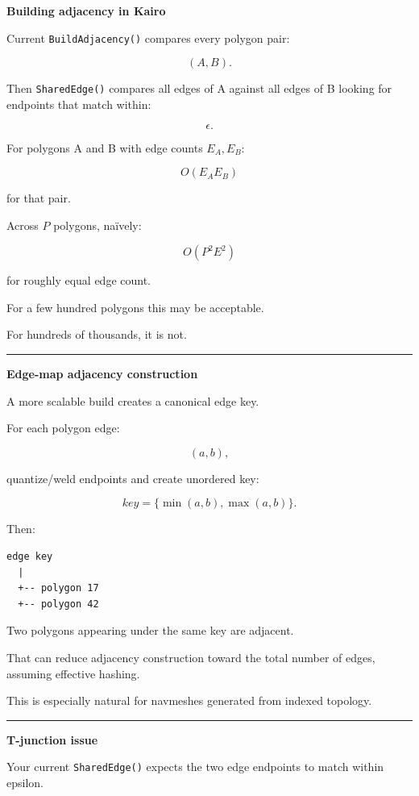 \textbf{Building adjacency in Kairo}

Current \texttt{BuildAdjacency()} compares every polygon pair:

\[
(A,B).
\]

Then \texttt{SharedEdge()} compares all edges of A against all edges of B looking for endpoints that match within:

\[
\epsilon.
\]

For polygons A and B with edge counts \(E_A,E_B\):

\[
O(E_AE_B)
\]

for that pair.

Across \(P\) polygons, naïvely:

\[
O(P^2E^2)
\]

for roughly equal edge count.

For a few hundred polygons this may be acceptable.

For hundreds of thousands, it is not.

\begin{center}\rule{0.5\linewidth}{0.5pt}\end{center}

\textbf{Edge-map adjacency construction}

A more scalable build creates a canonical edge key.

For each polygon edge:

\[
(a,b),
\]

quantize/weld endpoints and create unordered key:

\[
key=\{\min(a,b),\max(a,b)\}.
\]

Then:

\begin{verbatim}
edge key
  |
  +-- polygon 17
  +-- polygon 42
\end{verbatim}

Two polygons appearing under the same key are adjacent.

That can reduce adjacency construction toward the total number of edges, assuming effective hashing.

This is especially natural for navmeshes generated from indexed topology.

\begin{center}\rule{0.5\linewidth}{0.5pt}\end{center}

\textbf{T-junction issue}

Your current \texttt{SharedEdge()} expects the two edge endpoints to match within epsilon.

